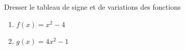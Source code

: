 
\begin{exercice}\label{exosmath-0201}

    Dresser le tableau de signe et de variations des fonctions
    \begin{enumerate}
        \item
            \( f(x)=x^2-4\)
        \item
            \( g(x)=4x^2-1\)
    \end{enumerate}

\end{exercice}
